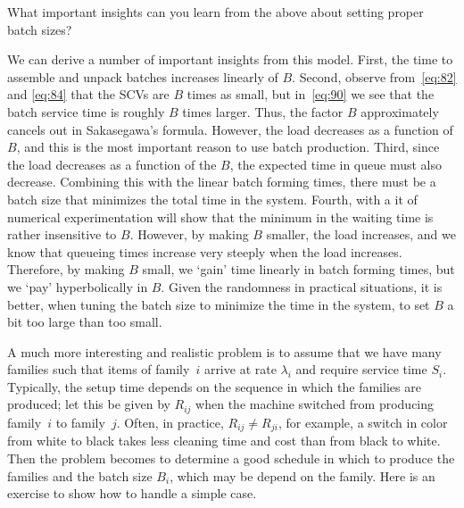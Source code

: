 \begin{exercise}
  What important insights can you learn from the above about setting proper batch sizes?
\begin{solution}
  We can derive a number of important insights from this model.
  First, the time to assemble and unpack batches increases linearly of $B$.
  Second, observe from~\cref{eq:82} and \cref{eq:84} that the SCVs are $B$ times as small, but in~\cref{eq:90} we see that the batch service time is roughly $B$ times larger.
  Thus, the factor $B$ approximately cancels out in Sakasegawa's formula.
  However, the load decreases as a function of $B$, and this is the most important reason to use batch production.
  Third, since the load decreases as a function of the $B$, the expected time in queue must also decrease.
  Combining this with the linear batch forming times, there must be a batch size that minimizes the total time in the system.
  Fourth, with a it of numerical experimentation will show that the minimum in the waiting time is rather insensitive to $B$.
  However, by making $B$ smaller, the load increases, and we know that queueing times increase very steeply when the load increases.
  Therefore, by making $B$ small, we `gain' time linearly in batch forming times, but we `pay' hyperbolically in $B$.
  Given the randomness in practical situations, it is better, when tuning the batch size to minimize the time in the system, to set $B$ a bit too large than too small.
\end{solution}
\end{exercise}

A much more interesting and realistic problem is to assume that we have many families such that items of family~$i$ arrive at rate $\lambda_i$ and require service time $S_i$.
Typically, the setup time depends on the sequence in which the families are produced; let this be given by $R_{ij}$ when the machine switched from producing family~$i$ to family~$j$.
Often, in practice, $R_{ij} \neq R_{ji}$, for example, a switch in color from white to black takes less cleaning time and cost than from black to white.
Then the problem becomes to determine a good schedule in which to produce the families and the batch size $B_i$, which may be depend on the family.
Here is an exercise to show how to handle a simple case.

